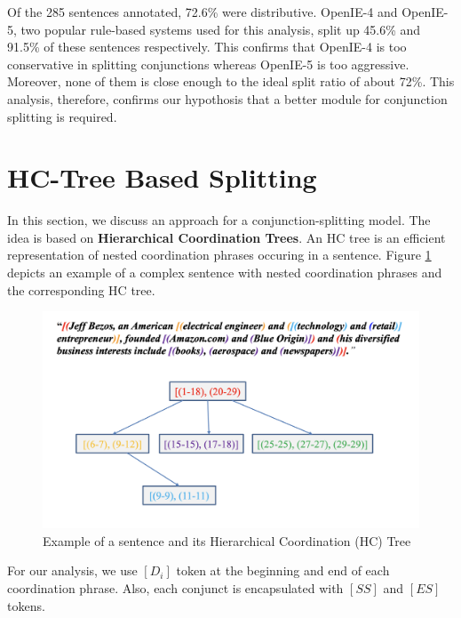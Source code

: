         Of the 285 sentences annotated, 72.6\% were distributive. OpenIE-4 and OpenIE-5, two popular rule-based systems used for this analysis, split up 45.6\% and 91.5\% of these sentences respectively. This confirms that OpenIE-4 is too conservative in splitting conjunctions whereas OpenIE-5 is too aggressive. Moreover, none of them is close enough to the ideal split ratio of about 72\%. This analysis, therefore, confirms our hypothosis that a better module for conjunction splitting is required.

\section{HC-Tree Based Splitting}

    In this section, we discuss an approach for a conjunction-splitting model. The idea is based on \textbf{Hierarchical Coordination Trees}. An HC tree is an efficient representation of nested coordination phrases occuring in a sentence. Figure \ref{fig:hc_tree_eg} depicts an example of a complex sentence with nested coordination phrases and the corresponding HC tree.

    \begin{figure}[h]
        \includegraphics[width=.99\hsize]{images/hc_tree.png}
        \caption{Example of a sentence and its Hierarchical Coordination (HC) Tree}
        \label{fig:hc_tree_eg}
    \end{figure}

    For our analysis, we use $[D_{i}]$ token at the beginning and end of each coordination phrase. Also, each conjunct is encapsulated with $[SS]$ and $[ES]$ tokens.

